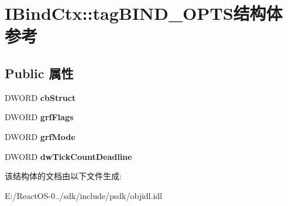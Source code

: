 \hypertarget{struct_i_bind_ctx_1_1tag_b_i_n_d___o_p_t_s}{}\section{I\+Bind\+Ctx\+:\+:tag\+B\+I\+N\+D\+\_\+\+O\+P\+T\+S结构体 参考}
\label{struct_i_bind_ctx_1_1tag_b_i_n_d___o_p_t_s}
\subsection*{Public 属性}
\begin{DoxyCompactItemize}
\item 
\mbox{\label{struct_i_bind_ctx_1_1tag_b_i_n_d___o_p_t_s_ae4298c7c8f90ccc2bdb65f3ee2070e4d}} 
D\+W\+O\+RD {\bfseries cb\+Struct}
\item 
\mbox{\label{struct_i_bind_ctx_1_1tag_b_i_n_d___o_p_t_s_a9230dc82e3af819f73159f26b0730882}} 
D\+W\+O\+RD {\bfseries grf\+Flags}
\item 
\mbox{\label{struct_i_bind_ctx_1_1tag_b_i_n_d___o_p_t_s_a9e081433e421ee3488c9dcc66fe42096}} 
D\+W\+O\+RD {\bfseries grf\+Mode}
\item 
\mbox{\label{struct_i_bind_ctx_1_1tag_b_i_n_d___o_p_t_s_a1a228dce6996a8308ac519586a5d679d}} 
D\+W\+O\+RD {\bfseries dw\+Tick\+Count\+Deadline}
\end{DoxyCompactItemize}


该结构体的文档由以下文件生成\+:\begin{DoxyCompactItemize}
\item 
E\+:/\+React\+O\+S-\/0../sdk/include/psdk/objidl.\+idl\end{DoxyCompactItemize}
